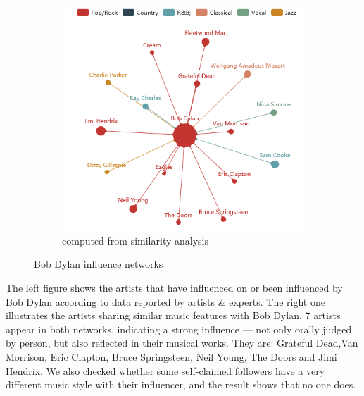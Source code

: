 \begin{figure}[htbp]
\begin{subfigure}{0.5\linewidth}
        \includegraphics[width=\textwidth]{figures/xdq/BOB2.png}
        \caption{computed from similarity analysis}
        \label{fig:bob2}
    \end{subfigure}
    \caption{Bob Dylan influence networks}
\end{figure}




The left figure shows the artists that have influenced on or been influenced by Bob Dylan according to data reported by artists \& experts. The right one illustrates the artists sharing similar music features with Bob Dylan. 7 artists appear in both networks, indicating a strong influence --- not only orally judged by person, but also reflected in their musical works. They are: Grateful Dead,Van Morrison, Eric Clapton, Bruce Springsteen, Neil Young, The Doors and Jimi Hendrix. We also checked whether some self-claimed followers have a very different music style with their influencer, and the result shows that no one does.



